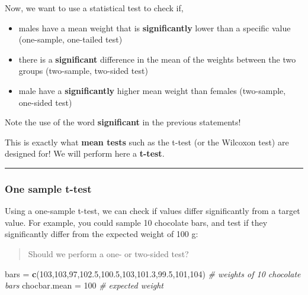 \documentclass[
]{book}
\newenvironment{Shaded}{\begin{snugshade}}{\end{snugshade}}
\newcommand{\CommentTok}[1]{\textcolor[rgb]{0.56,0.35,0.01}{\textit{#1}}}
\newcommand{\DecValTok}[1]{\textcolor[rgb]{0.00,0.00,0.81}{#1}}
\newcommand{\FloatTok}[1]{\textcolor[rgb]{0.00,0.00,0.81}{#1}}
\newcommand{\FunctionTok}[1]{\textcolor[rgb]{0.13,0.29,0.53}{\textbf{#1}}}
\newcommand{\NormalTok}[1]{#1}
\newcommand{\OtherTok}[1]{\textcolor[rgb]{0.56,0.35,0.01}{#1}}
\providecommand{\tightlist}{%
  \setlength{\itemsep}{0pt}\setlength{\parskip}{0pt}}
\begin{document}
Now, we want to use a statistical test to check if,

\begin{itemize}
\tightlist
\item
  males have a mean weight that is \textbf{significantly} lower than a specific value (one-sample, one-tailed test)
\item
  there is a \textbf{significant} difference in the mean of the weights between the two groups (two-sample, two-sided test)
\item
  male have a \textbf{significantly} higher mean weight than females (two-sample, one-sided test)
\end{itemize}

Note the use of the word \textbf{significant} in the previous statements!

This is exactly what \textbf{mean tests} such as the t-test (or the Wilcoxon test) are designed for!
We will perform here a \textbf{t-test}.

\begin{center}\rule{0.5\linewidth}{0.5pt}\end{center}

\hypertarget{one-sample-t-test}{%
\subsubsection{One sample t-test}\label{one-sample-t-test}}

Using a one-sample t-test, we can check if values differ significantly from a target value.
For example, you could sample 10 chocolate bars, and test if they significantly differ from the expected weight of 100 g:

\begin{quote}
Should we perform a one- or two-sided test?
\end{quote}

\begin{Shaded}
\begin{Highlighting}[]
\NormalTok{bars }\OtherTok{=} \FunctionTok{c}\NormalTok{(}\DecValTok{103}\NormalTok{,}\DecValTok{103}\NormalTok{,}\DecValTok{97}\NormalTok{,}\FloatTok{102.5}\NormalTok{,}\FloatTok{100.5}\NormalTok{,}\DecValTok{103}\NormalTok{,}\FloatTok{101.3}\NormalTok{,}\FloatTok{99.5}\NormalTok{,}\DecValTok{101}\NormalTok{,}\DecValTok{104}\NormalTok{) }\CommentTok{\# weights of 10 chocolate bars}
\NormalTok{chocbar.mean }\OtherTok{=} \DecValTok{100} \CommentTok{\# expected weight}
\end{Highlighting}
\end{Shaded}
\end{document}
